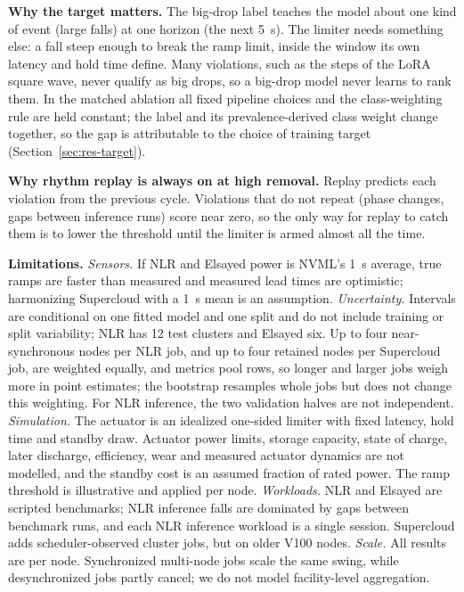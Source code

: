\documentclass[11pt]{article}
\begin{document}
\textbf{Why the target matters.} The big-drop label teaches the model about one kind of event (large
falls) at one horizon (the next 5~s). The limiter needs something else: a fall steep enough to break the
ramp limit, inside the window its own latency and hold time define. Many violations, such as the steps
of the LoRA square wave, never qualify as big drops, so a big-drop model never learns to rank them. In the
matched ablation all fixed pipeline choices and the class-weighting rule are held constant; the label and
its prevalence-derived class weight change together, so the gap is attributable to the choice of training
target (Section~\ref{sec:res-target}).

\textbf{Why rhythm replay is always on at high removal.} Replay predicts each violation from the previous
cycle. Violations that do not repeat (phase changes, gaps between inference runs) score near zero, so the
only way for replay to catch them is to lower the threshold until the limiter is armed almost all the
time.

\textbf{Limitations.}
\emph{Sensors.} If NLR and Elsayed power is NVML's 1~s average, true ramps are faster than measured and
measured lead times are optimistic; harmonizing Supercloud with a 1~s mean is an assumption.
\emph{Uncertainty.} Intervals are conditional on one fitted model and one split and do not include
training or split variability; NLR has 12 test clusters and Elsayed six. Up to four near-synchronous nodes
per NLR job, and up to four retained nodes per Supercloud job, are weighted equally, and metrics pool rows, so longer and larger
jobs weigh more in point estimates; the bootstrap resamples whole jobs but does not change this
weighting. For NLR inference, the two
validation halves are not independent.
\emph{Simulation.} The actuator is an idealized one-sided limiter with fixed latency, hold time and
standby draw. Actuator power limits, storage capacity, state of charge, later discharge, efficiency,
wear and measured actuator dynamics are not modelled, and the standby cost is an assumed fraction of rated
power. The ramp threshold is illustrative and applied per node.
\emph{Workloads.} NLR and Elsayed are scripted benchmarks; NLR inference falls are dominated by gaps
between benchmark runs, and each NLR inference workload is a single session. Supercloud adds scheduler-observed cluster
jobs, but on older V100 nodes.
\emph{Scale.} All results are per node. Synchronized multi-node jobs scale the same swing, while
desynchronized jobs partly cancel; we do not model facility-level aggregation.
\end{document}
